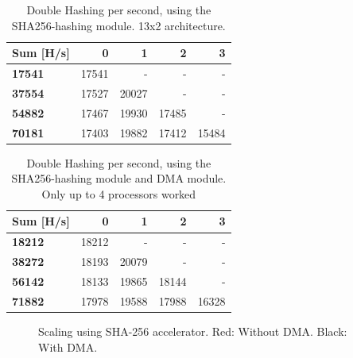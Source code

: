 \begin{appendix}
\begin{table}
\begin{tabular}{| l || r r r r |}
  \hline 
  \textbf{Sum} [H/s] & \textbf{0} & \textbf{1} & \textbf{2} & \textbf{3}\\
  \hline                       
  \textbf{17541} & 17541 & - & - & - \\
  \textbf{37554} & 17527 & 20027 & - & - \\
  \textbf{54882} & 17467 & 19930 & 17485 & - \\
  \textbf{70181} & 17403 & 19882 & 17412 & 15484 \\
  \hline  
\end{tabular}
\caption{Double Hashing per second, using the SHA256-hashing module. 13x2 architecture.}
\label{tab:Perf-SHA1}
\end{table}

\begin{table}
\begin{tabular}{| l || r r r r |}
  \hline 
  \textbf{Sum} [H/s] & \textbf{0} & \textbf{1} & \textbf{2} & \textbf{3}\\
  \hline                       
  \textbf{18212} & 18212 & - & - & - \\
  \textbf{38272} & 18193 & 20079 & - & - \\
  \textbf{56142} & 18133 & 19865 & 18144 & - \\
  \textbf{71882} & 17978 & 19588 & 17988 & 16328 \\
  \hline  
\end{tabular}
\caption{Double Hashing per second, using the SHA256-hashing module and DMA module. Only up to 4 processors worked}
\label{tab:Perf-SHADMA1}
\end{table}
				
\begin{figure}
	\caption{Scaling using SHA-256 accelerator. Red: Without DMA. Black: With DMA.}
	\label{fig:shadmacomp-scaling1}
\end{figure}


\end{appendix}
